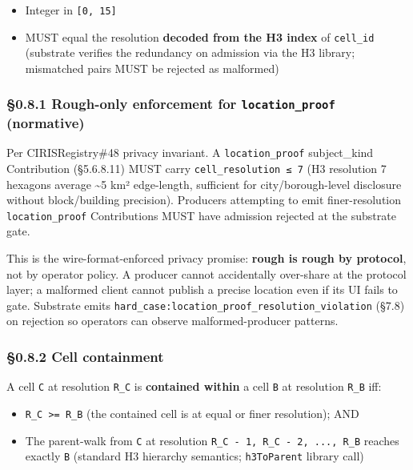 \documentclass[11pt]{article}
\begin{document}
\begin{itemize}\setlength\itemsep{0pt}
\item Integer in \texttt{[0, 15]}
\item MUST equal the resolution \textbf{decoded from the H3 index} of \texttt{cell\_id} (substrate verifies the redundancy on admission via the H3 library; mismatched pairs MUST be rejected as malformed)
\end{itemize}


\subsubsection*{§0.8.1 Rough-only enforcement for \texttt{location\_proof} (normative)}


Per CIRISRegistry\#48 privacy invariant. A \texttt{location\_proof} subject\_kind Contribution (§5.6.8.11) MUST carry \texttt{cell\_resolution ≤ 7} (H3 resolution 7 hexagons average \textasciitilde{}5 km² edge-length, sufficient for city/borough-level disclosure without block/building precision). Producers attempting to emit finer-resolution \texttt{location\_proof} Contributions MUST have admission rejected at the substrate gate.


This is the wire-format-enforced privacy promise: \textbf{rough is rough by protocol}, not by operator policy. A producer cannot accidentally over-share at the protocol layer; a malformed client cannot publish a precise location even if its UI fails to gate. Substrate emits \texttt{hard\_case:location\_proof\_resolution\_violation} (§7.8) on rejection so operators can observe malformed-producer patterns.


\subsubsection*{§0.8.2 Cell containment}


A cell \texttt{C} at resolution \texttt{R\_C} is \textbf{contained within} a cell \texttt{B} at resolution \texttt{R\_B} iff:


\begin{itemize}\setlength\itemsep{0pt}
\item \texttt{R\_C >= R\_B} (the contained cell is at equal or finer resolution); AND
\item The parent-walk from \texttt{C} at resolution \texttt{R\_C - 1, R\_C - 2, ..., R\_B} reaches exactly \texttt{B} (standard H3 hierarchy semantics; \texttt{h3ToParent} library call)
\end{itemize}
\end{document}
